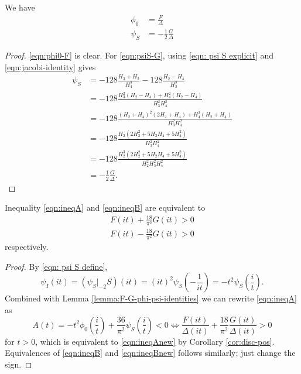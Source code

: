 \begin{lemma}\label{lemma:F-G-phi-psi-identities}
We have
\begin{align}
  \phi_0 &= \frac{F}{\Delta} \label{eqn:phi0-F} \\
  \psi_S &= -\frac{1}{2} \frac{G}{\Delta}\label{eqn:psiS-G}
\end{align}
\end{lemma}
\begin{proof}
\eqref{eqn:phi0-F} is clear.
For \eqref{eqn:psiS-G}, using \eqref{eqn: psi S explicit} and \eqref{eqn:jacobi-identity} gives
\begin{align}
  \psi_S &= -128 \frac{H_3 + H_2}{H_4^2} - 128 \frac{H_2 - H_4}{H_3^2} \\
  &= -128 \frac{H_3^2 (H_2 - H_4) + H_4^2 (H_2 - H_4)}{H_3^2 H_4^2} \\
  &= -128 \frac{(H_2 + H_4)^2 (2H_2 + H_4) + H_4^2(H_2 + H_4)}{H_3^2 H_4^2} \\
  &= -128 \frac{H_2 (2H_2^2 + 5 H_2 H_4 + 5 H_4^2)}{H_3^2 H_4^2} \\
  &= -128 \frac{H_2^3 (2H_2^2 + 5 H_2 H_4 + 5 H_4^2)}{H_2^2 H_3^2 H_4^2} \\
  &= - \frac{1}{2} \frac{G}{\Delta}.
\end{align}
\end{proof}

\begin{lemma}\label{lemma:ineqABnew-equiv}
Inequality \eqref{eqn:ineqA} and \eqref{eqn:ineqB} are equivalent to
\begin{align}
  F(it) + \frac{18}{\pi^2} G(it) > 0 \label{eqn:ineqAnew} \\
  F(it) - \frac{18}{\pi^2} G(it) > 0 \label{eqn:ineqBnew}
\end{align}
respectively.
\end{lemma}
\begin{proof}
By \eqref{eqn: psi S define},
\begin{equation}
  \psi_I(it) = (\psi_S|_{-2}S)(it) = (it)^{2}\psi_S\left(-\frac{1}{it}\right) = -t^2 \psi_S\left(\frac{i}{t}\right).
\end{equation}
Combined with Lemma \ref{lemma:F-G-phi-psi-identities} we can rewrite \eqref{eqn:ineqA} as
\begin{equation}
  A(t) = -t^2 \phi_0\left(\frac{i}{t}\right) + \frac{36}{\pi^2} \psi_S\left(\frac{i}{t}\right) < 0 \Leftrightarrow \frac{F(it)}{\Delta(it)} + \frac{18}{\pi^2} \frac{G(it)}{\Delta(it)} > 0
\end{equation}
for $t > 0$, which is equivalent to \eqref{eqn:ineqAnew} by Corollary \ref{cor:disc-pos}.
Equivalences of \eqref{eqn:ineqB} and \eqref{eqn:ineqBnew} follows similarly; just change the sign.
\end{proof}


